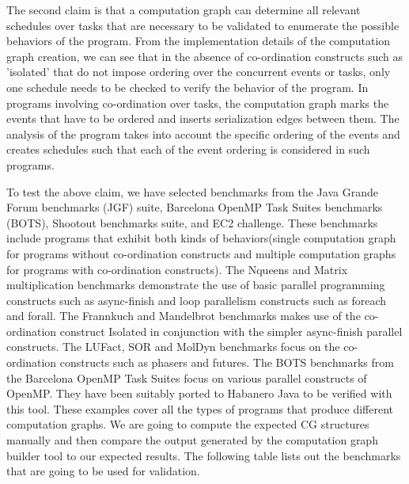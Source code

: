 The second claim is that a computation graph can determine all relevant schedules over tasks that are necessary to be validated to enumerate the possible behaviors of the program. From the implementation details of the computation graph creation, we can see that in the absence of co-ordination constructs such as 'isolated' that do not impose ordering over the concurrent events or tasks, only one schedule needs to be checked to verify the behavior of the program. In programs involving co-ordination over tasks, the computation graph marks the events that have to be ordered and inserts serialization edges between them. The analysis of the program takes into account the specific ordering of the events and creates schedules such that each of the event ordering is considered in such programs.

To test the above claim, we have selected benchmarks from the Java Grande Forum benchmarks (JGF) suite, Barcelona OpenMP Task Suites benchmarks (BOTS), Shootout benchmarks suite, and EC2 challenge. These benchmarks include programs that exhibit both kinds of behaviors(single computation graph for programs without co-ordination constructs and multiple computation graphs for programs with co-ordination constructs). The Nqueens and Matrix multiplication benchmarks demonstrate the use of basic parallel programming constructs such as async-finish and loop parallelism constructs such as foreach and forall. The Frannkuch and Mandelbrot benchmarks makes use of the co-ordination construct Isolated in conjunction with the simpler async-finish parallel constructs. The LUFact, SOR and MolDyn benchmarks focus on the co-ordination constructs such as phasers and futures. The BOTS  benchmarks from the Barcelona OpenMP Task Suites focus on various parallel constructs of OpenMP. They have been suitably ported to Habanero Java  to be verified with this tool. These examples cover all the types of programs that produce different computation graphs. We are going to compute the expected CG structures manually and then compare the output generated by the computation graph builder tool to our expected results. The following table lists out the benchmarks that are going to be used for validation.\\

